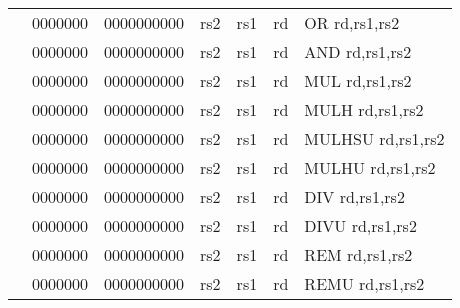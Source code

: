 \begin{table}[p]
\begin{small}
\begin{center}
\begin{tabular}{rcccccccccl}
&
\multicolumn{1}{|c|}{0000000} &
\multicolumn{5}{c|}{0000000000} &
\multicolumn{1}{c|}{rs2} &
\multicolumn{1}{c|}{rs1} &
\multicolumn{1}{c|}{rd} & OR rd,rs1,rs2 \\
\cline{2-10}
  

&
\multicolumn{1}{|c|}{0000000} &
\multicolumn{5}{c|}{0000000000} &
\multicolumn{1}{c|}{rs2} &
\multicolumn{1}{c|}{rs1} &
\multicolumn{1}{c|}{rd} & AND rd,rs1,rs2 \\
\cline{2-10}
  

&
\multicolumn{1}{|c|}{0000000} &
\multicolumn{5}{c|}{0000000000} &
\multicolumn{1}{c|}{rs2} &
\multicolumn{1}{c|}{rs1} &
\multicolumn{1}{c|}{rd} & MUL rd,rs1,rs2 \\
\cline{2-10}
  

&
\multicolumn{1}{|c|}{0000000} &
\multicolumn{5}{c|}{0000000000} &
\multicolumn{1}{c|}{rs2} &
\multicolumn{1}{c|}{rs1} &
\multicolumn{1}{c|}{rd} & MULH rd,rs1,rs2 \\
\cline{2-10}
  

&
\multicolumn{1}{|c|}{0000000} &
\multicolumn{5}{c|}{0000000000} &
\multicolumn{1}{c|}{rs2} &
\multicolumn{1}{c|}{rs1} &
\multicolumn{1}{c|}{rd} & MULHSU rd,rs1,rs2 \\
\cline{2-10}
  

&
\multicolumn{1}{|c|}{0000000} &
\multicolumn{5}{c|}{0000000000} &
\multicolumn{1}{c|}{rs2} &
\multicolumn{1}{c|}{rs1} &
\multicolumn{1}{c|}{rd} & MULHU rd,rs1,rs2 \\
\cline{2-10}
  

&
\multicolumn{1}{|c|}{0000000} &
\multicolumn{5}{c|}{0000000000} &
\multicolumn{1}{c|}{rs2} &
\multicolumn{1}{c|}{rs1} &
\multicolumn{1}{c|}{rd} & DIV rd,rs1,rs2 \\
\cline{2-10}
  

&
\multicolumn{1}{|c|}{0000000} &
\multicolumn{5}{c|}{0000000000} &
\multicolumn{1}{c|}{rs2} &
\multicolumn{1}{c|}{rs1} &
\multicolumn{1}{c|}{rd} & DIVU rd,rs1,rs2 \\
\cline{2-10}
  

&
\multicolumn{1}{|c|}{0000000} &
\multicolumn{5}{c|}{0000000000} &
\multicolumn{1}{c|}{rs2} &
\multicolumn{1}{c|}{rs1} &
\multicolumn{1}{c|}{rd} & REM rd,rs1,rs2 \\
\cline{2-10}
  

&
\multicolumn{1}{|c|}{0000000} &
\multicolumn{5}{c|}{0000000000} &
\multicolumn{1}{c|}{rs2} &
\multicolumn{1}{c|}{rs1} &
\multicolumn{1}{c|}{rd} & REMU rd,rs1,rs2 \\
\cline{2-10}
  


\end{tabular}
\end{center}
\end{small}
\end{table}
